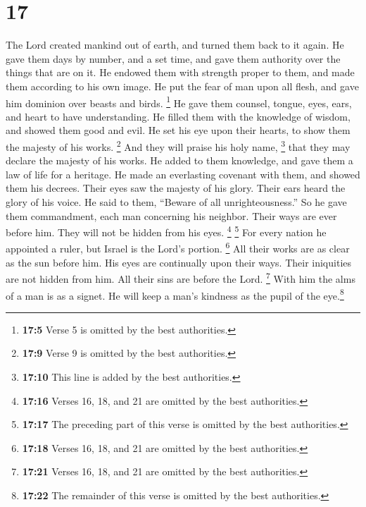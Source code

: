 \hypertarget{section-13}{%
\section{17}\label{section-13}}

 The Lord created mankind out of earth, and turned them
back to it again.  He gave them days by number, and a set
time, and gave them authority over the things that are on it.
 He endowed them with strength proper to them, and made
them according to his own image.  He put the fear of man
upon all flesh, and gave him dominion over beasts and birds.
 \footnote{\textbf{17:5} Verse 5 is omitted by the best
  authorities.}  He gave them counsel, tongue, eyes, ears,
and heart to have understanding.  He filled them with the
knowledge of wisdom, and showed them good and evil.  He
set his eye upon their hearts, to show them the majesty of his works.
 \footnote{\textbf{17:9} Verse 9 is omitted by the best
  authorities.}  And they will praise his holy name,
\footnote{\textbf{17:10} This line is added by the best authorities.}
that they may declare the majesty of his works.  He added
to them knowledge, and gave them a law of life for a heritage.
 He made an everlasting covenant with them, and showed
them his decrees.  Their eyes saw the majesty of his
glory. Their ears heard the glory of his voice.  He said
to them, ``Beware of all unrighteousness.'' So he gave them commandment,
each man concerning his neighbor.  Their ways are ever
before him. They will not be hidden from his eyes. 
\footnote{\textbf{17:16} Verses 16, 18, and 21 are omitted by the best
  authorities.}  \footnote{\textbf{17:17} The preceding
  part of this verse is omitted by the best authorities.} For every
nation he appointed a ruler, but Israel is the Lord's portion.
 \footnote{\textbf{17:18} Verses 16, 18, and 21 are
  omitted by the best authorities.}  All their works are
as clear as the sun before him. His eyes are continually upon their
ways.  Their iniquities are not hidden from him. All
their sins are before the Lord.  \footnote{\textbf{17:21}
  Verses 16, 18, and 21 are omitted by the best authorities.}
 With him the alms of a man is as a signet. He will keep
a man's kindness as the pupil of the eye.\footnote{\textbf{17:22} The
  remainder of this verse is omitted by the best authorities.}
